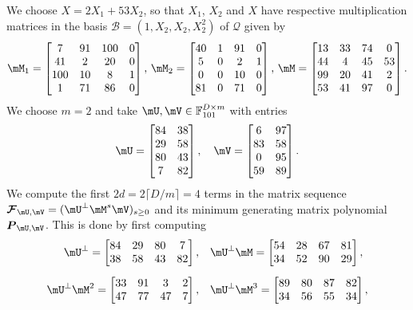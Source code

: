 \documentclass[12pt]{article}
\newcommand{\mat}[1]{\bm{\MakeUppercase{#1}}} %
\newcommand{\seq}{\mat{\mathcal{F}}} %
\newcommand{\basis}{\mathscr{B}}
\newcommand{\lf}{X}
\newcommand{\residueI}{\mathscr{Q}}
\def\F {\ensuremath{\mathbb{F}}}
\begin{document}
We choose $\lf = 2X_1 + 53 X_2$, so that $X_1$, $X_2$ and $\lf$ have respective multiplication matrices
in the basis $\basis=(1,X_2,X_2,X_2^2)$ of $\residueI$ given by
\begin{align*}
\mM_1 = \begin{bmatrix}
  7   & 91 & 100& 0\\
  41  & 2  & 20 & 0\\
  100 & 10 & 8  & 1\\
  1   & 71 & 86 & 0
\end{bmatrix},\,
\mM_2 = \begin{bmatrix}
  40&  1 & 91 & 0\\
  5 &  0 &  2 & 1\\
  0 &  0 & 10 & 0\\
  81&  0 & 71 & 0
\end{bmatrix},\,
\mM = \begin{bmatrix}
13 & 33&  74&  0\\
44 &  4&  45&  53\\
99 & 20&  41&  2\\
53 & 41&  97&  0
\end{bmatrix}.
\end{align*}
We choose $m = 2$ and take $\mU,\mV \in \F_{101}^{D\times m}$ with 
entries
$$ \mU = \begin{bmatrix}
84& 38\\
29& 58\\
80& 43\\
 7& 82
\end{bmatrix},\quad
\mV = \begin{bmatrix}
  6&  97\\
 83&  58\\
  0&  95\\
 59&  89
\end{bmatrix}.
$$ We compute the first $2d=2\lceil D/m\rceil =4$ terms in the matrix
sequence $\seq_{\mU,\mV} = (\mU^{\perp}\mM^s\mV)_{s\ge0}$ and its
minimum generating matrix polynomial $\mat{P}_{\mU,\mV}$. This is done
by first computing
\begin{align}\label{exampleproducts}
\mU^\perp =
\begin{bmatrix}
 84&  29&  80&   7\\
 38&  58&  43&  82
\end{bmatrix},
& 
\quad \mU^\perp \mM 
=
\begin{bmatrix}
 54&  28&  67&  81\\
 34&  52&  90&  29
\end{bmatrix},
 \\[2mm]
\mU^\perp \mM^2 
=
\begin{bmatrix}
33&  91&   3&  2\\
47&  77&  47&  7
\end{bmatrix},
 &\quad \mU^\perp \mM^3 
=
\begin{bmatrix}
89&  80&  87&  82\\
34&  56&  55&  34
\end{bmatrix}, \nonumber
\end{align}
\end{document}
